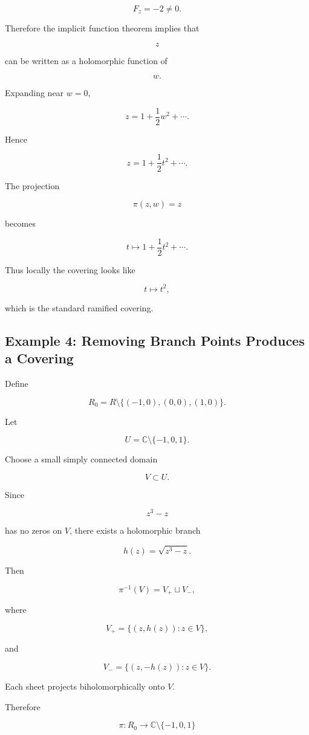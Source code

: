 \documentclass[12pt,a4paper]{article}
\theoremstyle{notespace}
\begin{document}
\[
F_z=-2\neq0.
\]

Therefore the implicit function theorem implies that

\[
z
\]

can be written as a holomorphic function of

\[
w.
\]

Expanding near \(w=0\),

\[
z
=
1+\frac12w^2+\cdots.
\]

Hence

\[
z
=
1+\frac12t^2+\cdots.
\]

The projection

\[
\pi(z,w)=z
\]

becomes

\[
t
\longmapsto
1+\frac12t^2+\cdots.
\]

Thus locally the covering looks like

\[
t\mapsto t^2,
\]

which is the standard ramified covering.

\bigskip

\subsection{Example 4: Removing Branch Points Produces a Covering}

Define

\[
R_0
=
R
\setminus
\{(-1,0),(0,0),(1,0)\}.
\]

Let

\[
U
=
\mathbb C
\setminus
\{-1,0,1\}.
\]

Choose a small simply connected domain

\[
V\subset U.
\]

Since

\[
z^3-z
\]

has no zeros on \(V\), there exists a holomorphic branch

\[
h(z)
=
\sqrt{z^3-z}.
\]

Then

\[
\pi^{-1}(V)
=
V_+
\sqcup
V_-,
\]

where

\[
V_+
=
\{(z,h(z)):z\in V\},
\]

and

\[
V_-
=
\{(z,-h(z)):z\in V\}.
\]

Each sheet projects biholomorphically onto \(V\).

Therefore

\[
\boxed{
	\pi:R_0
	\to
	\mathbb C\setminus\{-1,0,1\}
}
\]
\end{document}
